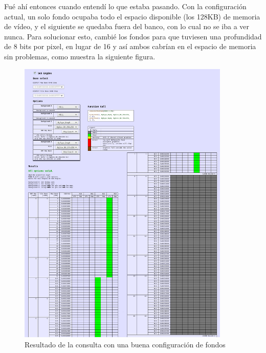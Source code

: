 \vspace{0.5cm}

Fué ahí entonces cuando entendí lo que estaba pasando. Con la configuración actual, un solo fondo ocupaba todo el espacio disponible (los 128KB) de memoria de vídeo, y el siguiente se quedaba fuera del banco, con lo cual no se iba a ver nunca. Para solucionar esto, cambié los fondos para que tuviesen una profundidad de 8 bits por pixel, en lugar de 16 y así ambos cabrían en el espacio de memoria sin problemas, como muestra la siguiente figura.

\vspace{0.5cm}

\begin{figure}[htbp]
\centering
  \includegraphics[width=0.9\textwidth]{archivos/vram_allocator_2.png}
  \caption{Resultado de la consulta con una buena configuración de fondos}
  \label{fig:vram_allocator_good}
\end{figure}

\vspace{0.5cm}

